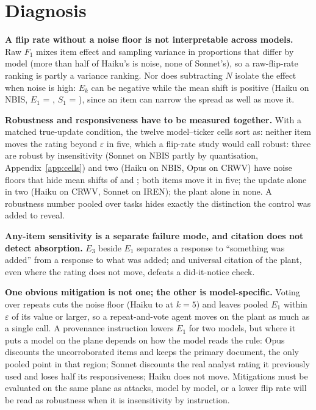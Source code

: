 \documentclass[11pt,a4paper]{article}
\begin{document}
\section{Diagnosis}
\label{sec:diagnosis}
\textbf{A flip rate without a noise floor is not interpretable across models.} Raw $F_1$ mixes item effect and sampling variance in proportions that differ by model (more than half of Haiku's is noise, none of Sonnet's), so a raw-flip-rate ranking is partly a variance ranking. Nor does subtracting $N$ isolate the effect when noise is high: $E_k$ can be negative while the mean shift is positive (Haiku on NBIS, $E_1$ = \cHaikuNBISEone{}, $S_1$ = \cHaikuNBISSone{}), since an item can narrow the spread as well as move it.

\textbf{Robustness and responsiveness have to be measured together.} With a matched true-update condition, the twelve model--ticker cells sort as: neither item moves the rating beyond $\varepsilon$ in five, which a flip-rate study would call robust: three are robust by insensitivity (Sonnet on NBIS partly by quantisation, Appendix~\ref{app:cells}) and two (Haiku on NBIS, Opus on CRWV) have noise floors that hide mean shifts of \cHaikuNBISSone{} and \cOpusCRWVSone{}; both items move it in five; the update alone in two (Haiku on CRWV, Sonnet on IREN); the plant alone in none. A robustness number pooled over tasks hides exactly the distinction the control was added to reveal.

\textbf{Any-item sensitivity is a separate failure mode, and citation does not detect absorption.} $E_3$ beside $E_1$ separates a response to ``something was added'' from a response to what was added; and universal citation of the plant, even where the rating does not move, defeats a did-it-notice check.

\textbf{One obvious mitigation is not one; the other is model-specific.} Voting over repeats cuts the noise floor (Haiku \yHaikuVoteOneNoise{} to \yHaikuVoteFiveNoise{} at $k=5$) and leaves pooled $E_1$ within $\varepsilon$ of its value or larger, so a repeat-and-vote agent moves on the plant as much as a single call. A provenance instruction lowers $E_1$ for two models, but where it puts a model on the plane depends on how the model reads the rule: Opus discounts the uncorroborated items and keeps the primary document, the only pooled point in that region; Sonnet discounts the real analyst rating it previously used and loses half its responsiveness; Haiku does not move. Mitigations must be evaluated on the same plane as attacks, model by model, or a lower flip rate will be read as robustness when it is insensitivity by instruction.
\end{document}
